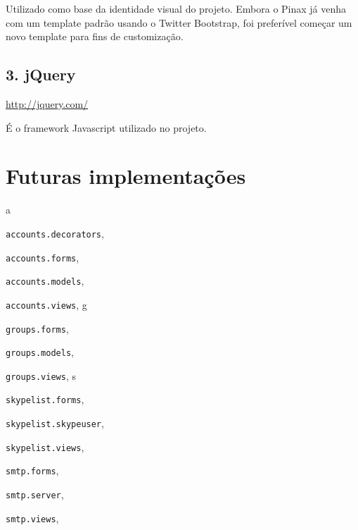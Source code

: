 \documentclass[letterpaper,10pt,brazil]{sphinxmanual}
\begin{document}
Utilizado como base da identidade visual do projeto. Embora o Pinax já venha com um template padrão usando o Twitter Bootstrap, foi preferível começar um novo template para fins de customização.


\subsection{3. jQuery}
\label{bibliotecas:jquery}
\href{http://jquery.com/}{http://jquery.com/}

É o framework Javascript utilizado no projeto.


\section{Futuras implementações}
\label{futuro::doc}\label{futuro:futuras-implementacoes}

\renewcommand{\indexname}{Índice de Módulos do Python}
\begin{theindex}
\def\bigletter#1{{\Large\sffamily#1}\nopagebreak\vspace{1mm}}
\bigletter{a}
\item {\texttt{accounts.decorators}}, \pageref{apps/accounts:module-accounts.decorators}
\item {\texttt{accounts.forms}}, \pageref{apps/accounts:module-accounts.forms}
\item {\texttt{accounts.models}}, \pageref{apps/accounts:module-accounts.models}
\item {\texttt{accounts.views}}, \pageref{apps/accounts:module-accounts.views}
\indexspace
\bigletter{g}
\item {\texttt{groups.forms}}, \pageref{apps/groups:module-groups.forms}
\item {\texttt{groups.models}}, \pageref{apps/groups:module-groups.models}
\item {\texttt{groups.views}}, \pageref{apps/groups:module-groups.views}
\indexspace
\bigletter{s}
\item {\texttt{skypelist.forms}}, \pageref{apps/skypelist:module-skypelist.forms}
\item {\texttt{skypelist.skypeuser}}, \pageref{apps/skypelist:module-skypelist.skypeuser}
\item {\texttt{skypelist.views}}, \pageref{apps/skypelist:module-skypelist.views}
\item {\texttt{smtp.forms}}, \pageref{apps/smtp:module-smtp.forms}
\item {\texttt{smtp.server}}, \pageref{apps/smtp:module-smtp.server}
\item {\texttt{smtp.views}}, \pageref{apps/smtp:module-smtp.views}
\end{theindex}

\renewcommand{\indexname}{Índice}
\printindex
\end{document}
